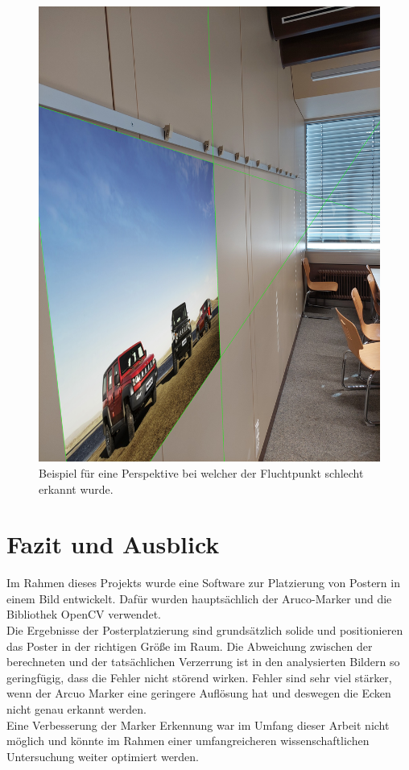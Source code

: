 \documentclass[a4paper,twocolumn]{article}
\begin{document}
\begin{figure}[h!]
    \centering
    \includegraphics[width=0.9\columnwidth]{img/img_result_bad_113437.jpg} %
    \caption{Beispiel für eine Perspektive bei welcher der Fluchtpunkt schlecht erkannt wurde.}
    \label{fig:bad-example-result}
\end{figure}

\section{Fazit und Ausblick}

Im Rahmen dieses Projekts wurde eine Software zur Platzierung von Postern in einem Bild entwickelt. Dafür wurden hauptsächlich der Aruco-Marker und die Bibliothek OpenCV verwendet.
\\
Die Ergebnisse der Posterplatzierung sind grundsätzlich solide und positionieren das Poster in der richtigen Größe im Raum. Die Abweichung zwischen der berechneten und der tatsächlichen Verzerrung ist in den analysierten Bildern so geringfügig, dass die Fehler nicht störend wirken. Fehler sind sehr viel stärker, wenn der Arcuo Marker eine geringere Auflösung hat und deswegen die Ecken nicht genau erkannt werden.
\\
Eine Verbesserung der Marker Erkennung war im Umfang dieser Arbeit nicht möglich und könnte im Rahmen einer umfangreicheren wissenschaftlichen Untersuchung weiter optimiert werden.
\end{document}
